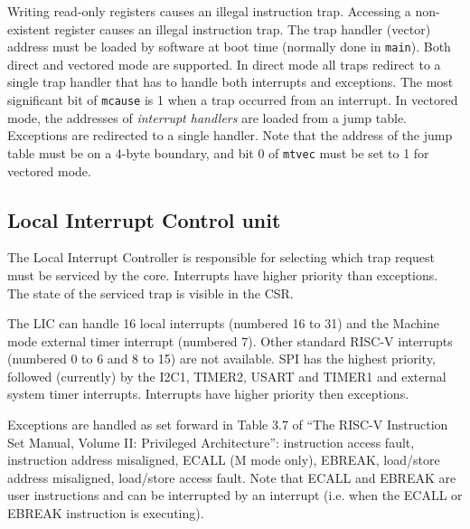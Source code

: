 \documentclass[12pt]{article}
\begin{document}

Writing read-only registers causes an illegal instruction trap. Accessing a non-existent register causes an illegal instruction trap. The trap handler (vector) address must be loaded by software at boot time (normally done in \lstinline|main|). Both direct and vectored mode are supported. In direct mode all traps redirect to a single trap handler that has to handle both interrupts and exceptions. The most significant bit of \lstinline|mcause| is 1 when a trap occurred from an interrupt. In vectored mode, the addresses of \emph{interrupt handlers} are loaded from a jump table. Exceptions are redirected to a single handler. Note that the address of the jump table must be on a 4-byte boundary, and bit 0 of \lstinline|mtvec| must be set to 1 for vectored mode.


\subsection{Local Interrupt Control unit}
The Local Interrupt Controller is responsible for selecting which trap request must be serviced by the core. Interrupts have higher priority than exceptions. The state of the serviced trap is visible in the CSR.

The LIC can handle 16 local interrupts (numbered 16 to 31) and the Machine mode external timer interrupt (numbered 7). Other standard RISC-V interrupts (numbered 0 to 6 and 8 to 15) are not available. SPI has the highest priority, followed (currently) by the I2C1, TIMER2, USART and TIMER1 and external system timer interrupts. Interrupts have higher priority then exceptions.

Exceptions are handled as set forward in Table 3.7 of ``The RISC-V Instruction Set Manual, Volume II: Privileged Architecture'': instruction access fault, instruction address misaligned, ECALL (M mode only), EBREAK, load/store address misaligned, load/store access fault. Note that ECALL and EBREAK are user instructions and can be interrupted by an interrupt (i.e. when the ECALL or EBREAK instruction is executing).
\end{document}
